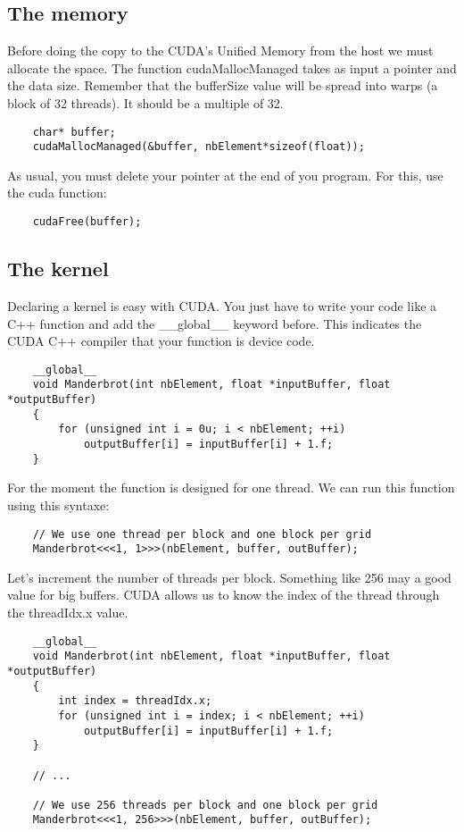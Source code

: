 \documentclass{article}
\begin{document}
\subsection{The memory}
	Before doing the copy to the CUDA's Unified Memory from the host we must allocate the space. The function cudaMallocManaged takes as input a pointer and the data size. Remember that the bufferSize value will be spread into warps (a block of 32 threads). It should be a multiple of 32.
\begin{lstlisting}
	char* buffer;
	cudaMallocManaged(&buffer, nbElement*sizeof(float));
\end{lstlisting}
As usual, you must delete your pointer at the end of you program. For this, use the cuda function:
\begin{lstlisting}
	cudaFree(buffer);
\end{lstlisting}

\subsection{The kernel}
	Declaring a kernel is easy with CUDA. You just have to write your code like a C++ function and add the \_\_global\_\_ keyword before. This indicates the CUDA C++ compiler that your function is device code.
\begin{lstlisting}
	__global__
	void Manderbrot(int nbElement, float *inputBuffer, float *outputBuffer)
	{
		for (unsigned int i = 0u; i < nbElement; ++i)
			outputBuffer[i] = inputBuffer[i] + 1.f;
	}
\end{lstlisting}
For the moment the function is designed for one thread. We can run this function using this syntaxe:
\begin{lstlisting}
	// We use one thread per block and one block per grid
	Manderbrot<<<1, 1>>>(nbElement, buffer, outBuffer);
\end{lstlisting}
Let's increment the number of threads per block. Something like 256 may a good value for big buffers. CUDA allows us to know the index of the thread through the threadIdx.x value. 

\begin{lstlisting}
	__global__
	void Manderbrot(int nbElement, float *inputBuffer, float *outputBuffer)
	{
		int index = threadIdx.x;
		for (unsigned int i = index; i < nbElement; ++i)
			outputBuffer[i] = inputBuffer[i] + 1.f;
	}
	
	// ...

	// We use 256 threads per block and one block per grid
	Manderbrot<<<1, 256>>>(nbElement, buffer, outBuffer);
\end{lstlisting}
\end{document}

